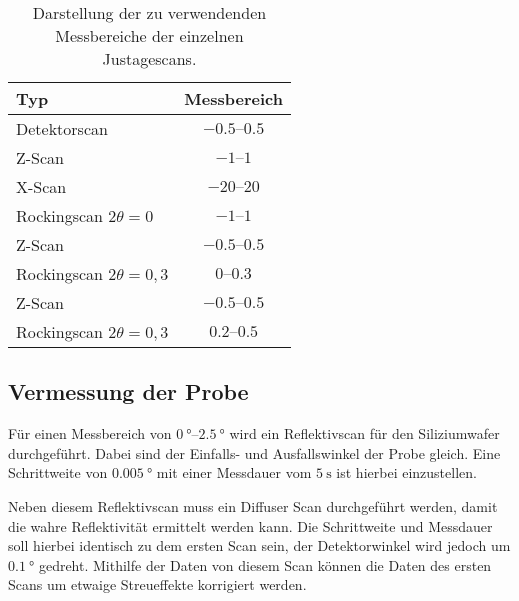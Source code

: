 \begin{table}
    \centering
    \caption{Darstellung der zu verwendenden Messbereiche der einzelnen Justagescans.}
    \label{tab:Messbereiche}
    \begin{tabular}{l c}
      \toprule
      {Typ} & {Messbereich} \\
      \midrule
      {Detektorscan}                & {$\numrange{-0,5}{0,5}$}  \\
      {Z-Scan}                      & {$\numrange{-1}{1}$}      \\
      {X-Scan}                      & {$\numrange{-20}{20}$}    \\
      {Rockingscan $2\theta=0$}     & {$\numrange{-1}{1}$}      \\
      {Z-Scan}                      & {$\numrange{-0,5}{0,5}$}  \\
      {Rockingscan $2\theta=0,3$}   & {$\numrange{0}{0,3}$}     \\
      {Z-Scan}                      & {$\numrange{-0,5}{0,5}$}  \\
      {Rockingscan $2\theta=0,3$}   & {$\numrange{0,2}{0,5}$}   \\
      \bottomrule
    \end{tabular}
  \end{table}

\subsection{Vermessung der Probe}
Für einen Messbereich von $\qtyrange{0}{2,5}{\degree}$ wird ein Reflektivscan für den Siliziumwafer durchgeführt. Dabei sind der Einfalls- und Ausfallswinkel 
der Probe gleich. Eine Schrittweite von $\qty{0,005}{\degree}$ mit einer Messdauer vom $\qty{5}{\second}$ ist hierbei einzustellen.

Neben diesem Reflektivscan muss ein Diffuser Scan durchgeführt werden, damit die wahre Reflektivität ermittelt werden kann. Die Schrittweite und Messdauer
soll hierbei identisch zu dem ersten Scan sein, der Detektorwinkel wird jedoch um $\qty{0,1}{\degree}$ gedreht.
Mithilfe der Daten von diesem Scan können die Daten des ersten Scans um etwaige Streueffekte korrigiert werden.